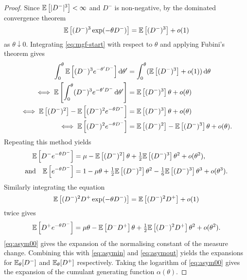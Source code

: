 \begin{proof}
    Since ${\mathbb E}\left[\lvert D^-\rvert^3\right] < \infty$ and $D^-$ is non-negative, by the dominated convergence theorem
    \begin{equation}
        {\mathbb E} \left[ (D^-)^3 \exp(-\theta D^-) \right] = {\mathbb E} \left[ (D^-)^3 \right] + o(1)
        \label{eq:mgf-start}
    \end{equation}
    as $\theta \downarrow 0$. Integrating \cref{eq:mgf-start} with respect to $\theta$ and applying Fubini's theorem gives
    \begin{align}
        \int_0^{\theta} {\mathbb E} \left[ (D^-)^3 e^{-\theta' D^-}\right] \mathop{}\!\mathrm{d} \theta'
        &= \int_0^{\theta} ({\mathbb E} \left[ (D^-)^3 \right] + o(1) ) \mathop{}\!\mathrm{d} \theta \nonumber \\
        \iff {\mathbb E} \left[ \int_0^{\theta} (D^-)^3 e^{-\theta' D^-} \mathop{}\!\mathrm{d} \theta' \right]
        &= {\mathbb E} \left[ (D^-)^3 \right] \theta + o(\theta) \nonumber \\
        \iff {\mathbb E} \left[ (D^-)^2 \right] - {\mathbb E} \left[ (D^-)^2 e^{-\theta D^-} \right]
        &= {\mathbb E} \left[ (D^-)^3 \right] \theta + o(\theta)  \nonumber \\
        \iff {\mathbb E} \left[ (D^-)^2 e^{-\theta D^-} \right]
        &= {\mathbb E} \left[ (D^-)^2 \right] - {\mathbb E} \left[ (D^-)^3 \right] \theta + o(\theta). \nonumber
    \end{align}
    Repeating this method yields
    \begin{align}
        {\mathbb E} \left[ D^- e^{-\theta D^-} \right]
        &= \mu - {\mathbb E} \left[ (D^-)^2 \right] \theta + \tfrac{1}{2} {\mathbb E} \left[ (D^-)^3 \right] \theta^2 + o(\theta^2), \label{eq:asymin} \\
        \text{and} \quad {\mathbb E} \left[ e^{-\theta D^-} \right]
        &= 1 - \mu \theta + \tfrac{1}{2} {\mathbb E} \left[ (D^-)^2 \right] \theta^2 - \tfrac{1}{6} {\mathbb E} \left[ (D^-)^3 \right] \theta^3 + o(\theta^3).
        \label{eq:asym00}
    \end{align}
    Similarly integrating the equation
    \begin{equation*}
        {\mathbb E} \left[ (D^-)^2 D^+ \exp(-\theta D^-) \right] = {\mathbb E} \left[ (D^-)^2 D^+ \right] + o(1)
    \end{equation*}
    twice gives
    \begin{equation}
        {\mathbb E} \left[ D^+ e^{-\theta D^-} \right]
        = \mu \theta - {\mathbb E} \left[ D^- D^+ \right] \theta + \tfrac{1}{2} {\mathbb E} \left[ (D^-)^2 D^+ \right] \theta^2 + o(\theta^2).
        \label{eq:asymout}
    \end{equation}
    \cref{eq:asym00} gives the expansion of the normalising constant of the measure change. Combining this with \cref{eq:asymin} and \cref{eq:asymout} yields the expansions for ${\mathbb E}_{\theta}[D^-]$ and ${\mathbb E}_{\theta}[D^+]$ respectively. Taking the logarithm of \cref{eq:asym00} gives the expansion of the cumulant generating function $\alpha(\theta)$.
\end{proof}

